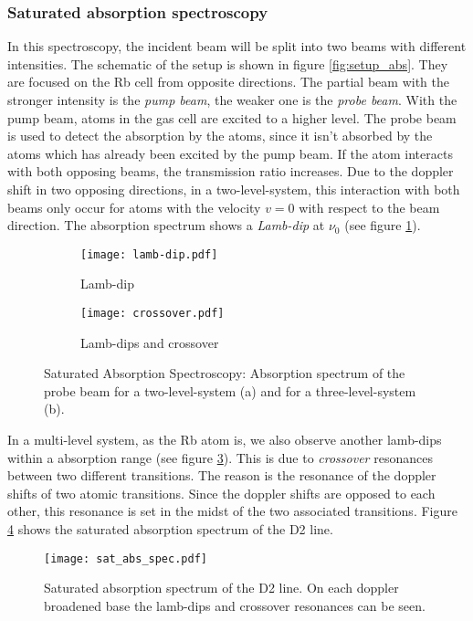 \newpage
\subsubsection{Saturated absorption spectroscopy}
\enlargethispage{4em}
In this spectroscopy, the incident beam will be split into two beams with different intensities. The schematic of the setup is shown in figure \ref{fig:setup_abs}. They are focused on the Rb cell from opposite directions. The partial beam with the stronger intensity is the \emph{pump beam}, the weaker one is the \emph{probe beam}. With the pump beam, atoms in the gas cell are excited to a higher level. The probe beam is used to detect the absorption by the atoms, since it isn't absorbed by the atoms which has already been excited by the pump beam. If the atom interacts with both opposing beams, the transmission ratio increases. Due to the doppler shift in two opposing directions, in a two-level-system, this interaction with both beams only occur for atoms with the velocity $v=0$ with respect to the beam direction. The absorption spectrum shows a \emph{Lamb-dip} at $\nu_0$ (see figure \ref{fig:lamb-dip}).

\begin{figure}[h]
	\centering
	\vspace{-3ex}
	\begin{subfigure}{0.45\textwidth}
		\centering
		\texttt{[image: lamb-dip.pdf]}
		\vspace{-2em}
		\caption{Lamb-dip}
		\label{fig:lamb-dip}
	\end{subfigure}
	\hfill
	\begin{subfigure}{0.45\textwidth}
		\centering
		\texttt{[image: crossover.pdf]}
		\vspace{-2em}
		\caption{Lamb-dips and crossover}
		\label{fig:crossover}
	\end{subfigure}
	\caption[Saturated Absorption Spectroscopy]{Saturated Absorption Spectroscopy: Absorption spectrum of the probe beam for a two-level-system (a) and for a three-level-system (b).}
	\vspace{-1ex}
\end{figure}
In a multi-level system, as the Rb atom is, we also observe another lamb-dips within a absorption range (see figure \ref{fig:crossover}). This is due to \emph{crossover} resonances between two different transitions. The reason is the resonance of the doppler shifts of two atomic transitions. Since the doppler shifts are opposed to each other, this resonance is set in the midst of the two associated transitions.
Figure \ref{fig:sat_abs_spec} shows the saturated absorption spectrum of the D2 line.
\begin{figure}[h]
	\centering
	\vspace{-1em}
	\texttt{[image: sat\_abs\_spec.pdf]}
	\caption[Saturated absorption spectrum of the D2 line]{Saturated absorption spectrum of the D2 line. On each doppler broadened base the lamb-dips and crossover resonances can be seen. \cite{lit:AK_manual2012}}
	\label{fig:sat_abs_spec}
	\vspace{-3em}
\end{figure}

